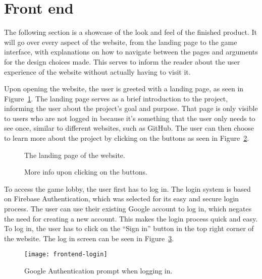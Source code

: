 \section{Front end}\label{sec:frontend}

The following section is a showcase of the look and feel of the finished product.
It will go over every aspect of the website, from the landing page to the game interface, with explanations on how to
navigate between the pages and arguments for the design choices made.
This serves to inform the reader about the user experience of the website without actually having to visit it.

Upon opening the website, the user is greeted with a landing page, as seen in Figure~\ref{fig:home}.
The landing page serves as a brief introduction to the project, informing the user about the project's goal and purpose.
That page is only visible to users who are not logged in because it's something that the user only needs to see once,
similar to different websites, such as GitHub.
The user can then choose to learn more about the project by clicking on the buttons as seen in
Figure~\ref{fig:home-info}.

\begin{figure}[H]
    \centering
    \setlength{\fboxsep}{0pt}
    \caption{The landing page of the website.}\label{fig:home}
\end{figure}

\begin{figure}[H]
    \centering
    \setlength{\fboxsep}{0pt}
    \caption{More info upon clicking on the buttons.}\label{fig:home-info}
\end{figure}

To access the game lobby, the user first has to log in.
The login system is based on Firebase Authentication, which was selected for its easy and secure login process.
The user can use their existing Google account to log in, which negates the need for creating a new account.
This makes the login process quick and easy.
To log in, the user has to click on the ``Sign in'' button in the top right corner of the website.
The log in screen can be seen in Figure~\ref{fig:login}.

\begin{figure}[H]
    \centering
    \texttt{[image: frontend-login]}
    \caption{Google Authentication prompt when logging in.}\label{fig:login}
\end{figure}

